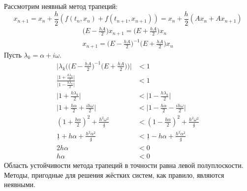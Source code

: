 \documentclass[a4paper,11pt]{article}
\begin{document}
Рассмотрим неявный метод трапеций:
\[x_{n+1} = x_n + \frac{h}{2}(f(t_n, x_n) + f(t_{n+1}, x_{n+1})) = x_n + \frac{h}{2}(Ax_n + Ax_{n+1})\]
\begin{gather*}
  \Big(E - \frac{hA}{2}\Big)x_{n+1} = \Big(E + \frac{hA}{2}\Big)x_n \\
  x_{n+1} = \Big(E - \frac{hA}{2}\Big)^{-1}\Big(E + \frac{hA}{2}\Big)x_n
\end{gather*}
Пусть $\lambda_k = \alpha + i\omega$.
\begin{align*}
  \bigg|\lambda_k\bigg(\Big(E - \frac{hA}{2}\Big)^{-1}\Big(E + \frac{hA}{2}\Big)\bigg)\bigg| &< 1 \\
  \frac{\Big|1 + \frac{h\lambda_k}{2}\Big|}{\Big|1 - \frac{h\lambda_k}{2}\Big|} &< 1 \\
  \Big|1 + \frac{h\lambda_k}{2}\Big| &< \Big|1 - \frac{h\lambda_k}{2}\Big| \\
  \Big|1 + \frac{h\alpha}{2} + \frac{ih\omega}{2}\Big| &< \Big|1 - \frac{h\alpha}{2} - \frac{ih\omega}{2}\Big| \\
  (1 + \frac{h\alpha}{2})^2 + \underline{\frac{h^2\omega^2}{4}} &< (1 - \frac{h\alpha}{2})^2 + \underline{\frac{h^2\omega^2}{4}} \\
  \underline{1} + h\alpha + \underline{\frac{h^2\alpha^2}{4}} &< \underline{1} - h\alpha + \underline{\frac{h^2\alpha^2}{4}} \\
  2h\alpha &< 0 \\
  h\alpha &< 0
\end{align*}
Область устойчивости метода трапеций в точности равна левой полуплоскости. \\
Методы, пригодные для решения жёстких систем, как правило, являются неявными.
\end{document}
